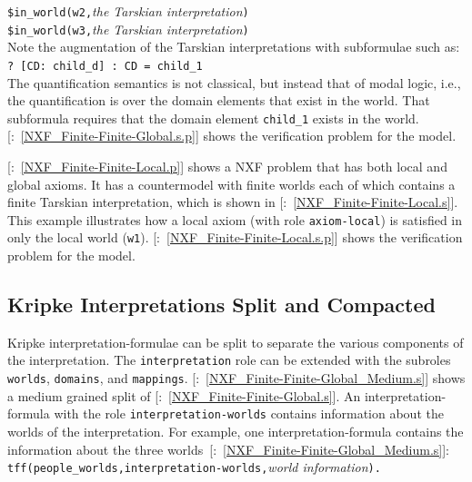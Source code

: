\documentclass{easychair}
\newcommand{\smalltt}[1]{\small \texttt{#1}}
\newcommand{\example}{{\scriptsize \faFile[regular]}}
\begin{document}
\hspace*{0.5cm}\smalltt{\$in\_world(w2,}\emph{the Tarskian interpretation}\smalltt{)} \\
\hspace*{0.5cm}\smalltt{\$in\_world(w3,}\emph{the Tarskian interpretation}\smalltt{)} \\
Note the augmentation of the Tarskian interpretations with subformulae such as:\\
\hspace*{0.5cm}\smalltt{?\,[CD:\,child\_d]\,:\,CD\,=\,child\_1}\\
The quantification semantics is not classical, but instead that of modal logic, i.e., the 
quantification is over the domain elements that exist in the world.
That subformula requires that the domain element \smalltt{child\_1} exists in the world.
[\example{}:~\ref{NXF_Finite-Finite-Global.s.p}] shows the verification problem for the model.

[\example{}:~\ref{NXF_Finite-Finite-Local.p}] shows a NXF problem 
that has both local and global axioms.
It has a countermodel with finite worlds each of which contains a finite Tarskian interpretation, 
which is shown in [\example{}:~\ref{NXF_Finite-Finite-Local.s}].
This example illustrates how a local axiom (with role \smalltt{axiom-local}) is satisfied in 
only the local world (\smalltt{w1}).
[\example{}:~\ref{NXF_Finite-Finite-Local.s.p}] shows the verification 
problem for the model.

\subsection{Kripke Interpretations Split and Compacted}
\label{NewKripkeSplitCompact}

Kripke interpretation-formulae can be split to separate the various components of the 
interpretation.
The \smalltt{interpretation} role can be extended with the subroles \smalltt{worlds},
\smalltt{domains}, and \smalltt{mappings}.
[\example{}:~\ref{NXF_Finite-Finite-Global_Medium.s}] shows a medium 
grained split of [\example{}:~\ref{NXF_Finite-Finite-Global.s}].
An interpretation-formula with the role \smalltt{interpretation-worlds} contains information about 
the worlds of the interpretation.
For example, one interpretation-formula contains the information about the three 
worlds~[\example{}:~\ref{NXF_Finite-Finite-Global_Medium.s}]: \\
\hspace*{0.5cm}\smalltt{tff(people\_worlds,interpretation-worlds,}\emph{world information}\smalltt{).}
\end{document}
